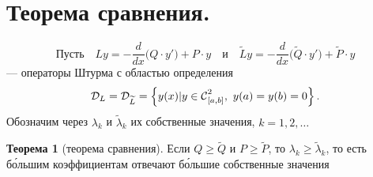 \documentclass[12pt,a4paper,openany,fleqn]{book}
\newcommand{\Cf}{\ensuremath{\mathcal{C}}}
\newcommand{\mc}[1]{\ensuremath{\mathcal{#1}}}
\newcommand{\Cfn}[2][]{\ensuremath{\Cf{\mathstrut}^{#2}_{#1}}}
\newcommand{\der}[2]{\ensuremath{\frac{d#1}{d#2}}}
\theoremstyle{definition}
\newtheorem{_teor}{Теорема}[section]
\begin{document}
	\section{Теорема сравнения.}
	\label{lecture6section1}
	\begin{equation*}
		\text{Пусть}\quad Ly=-\der{}{x}\Big(Q\cdot y'\Big)+P\cdot y\quad\text{и}\quad  \widetilde{L}y=-\der{}{x}\Big(\widetilde{Q}\cdot y'\Big)+\widetilde{P}\cdot y
	\end{equation*}
	--- операторы Штурма с областью определения 
	\begin{equation*}
		\hfill\mc{D}_L=\mc{D}_{\widetilde{L}}=\left\{y(x)|y\in\Cfn[{[a,b]}]{2},\ y(a)=y(b)=0\right\}.\hfill
	\end{equation*}
	Обозначим через $\lambda_k$ и $\widetilde{\lambda}_k$ их собственные значения, $k=1,2,\ldots$
	\begin{_teor}[теорема сравнения]
		Если $Q\geqslant\widetilde{Q}$ и $P\geqslant\widetilde{P}$, то $\lambda_k\geqslant\widetilde{\lambda}_k$, то есть б\'{о}льшим коэффициентам отвечают б\'{о}льшие собственные значения
	\end{_teor}
\end{document}
